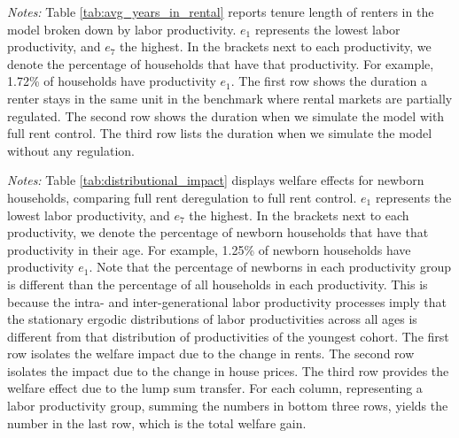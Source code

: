 \documentclass[parskip=full]{article}
\newenvironment{fignote2}[1]
{
\par
\medskip
\begin{minipage}{#1}
\footnotesize
}
{
\end{minipage}
}
\begin{document}
\begin{table}[H]
    \centering
    \caption{Avg. years in same rental unit by labor productivity for all renters}
    \vspace{-0.5cm}
    \label{tab:avg_years_in_rental}
    
    \vspace{-0.45cm}
    \begin{fignote2}{1.07\textwidth}
      \textit{Notes:} Table \ref{tab:avg_years_in_rental} reports tenure length of renters in the model broken down by labor productivity. $e_{1}$ represents the lowest labor productivity, and $e_{7}$ the highest. In the brackets next to each productivity, we denote the percentage of households that have that productivity. For example, 1.72\% of households have productivity $e_{1}$. The first row shows the duration a renter stays in the same unit in the benchmark where rental markets are partially regulated. The second row shows the duration when we simulate the model with full rent control. The third row lists the duration when we simulate the model without any regulation.
    \end{fignote2}
\end{table}

\begin{table}[H]
    \centering
    \caption{Newborns' distributional impact by labor productivity (full deregulation relative to full rent control)}
    \vspace{-0.5cm}
    \label{tab:distributional_impact}
    
    \vspace{-0.45cm}
    \begin{fignote2}{0.95\textwidth}
      \textit{Notes:} Table \ref{tab:distributional_impact} displays welfare effects for newborn households, comparing full rent deregulation to full rent control. $e_{1}$ represents the lowest labor productivity, and $e_{7}$ the highest. In the brackets next to each productivity, we denote the percentage of newborn households that have that productivity in their age. For example, 1.25\% of newborn households have productivity $e_{1}$. Note that the percentage of newborns in each productivity group is different than the percentage of all households in each productivity. This is because the intra- and inter-generational labor productivity processes imply that the stationary ergodic distributions of labor productivities across all ages is different from that distribution of productivities of the youngest cohort. The first row isolates the welfare impact due to the change in rents. The second row isolates the impact due to the change in house prices. The third row provides the welfare effect due to the lump sum transfer. For each column, representing a labor productivity group, summing the numbers in bottom three rows, yields the number in the last row, which is the total welfare gain.
    \end{fignote2}
\end{table}
\end{document}
